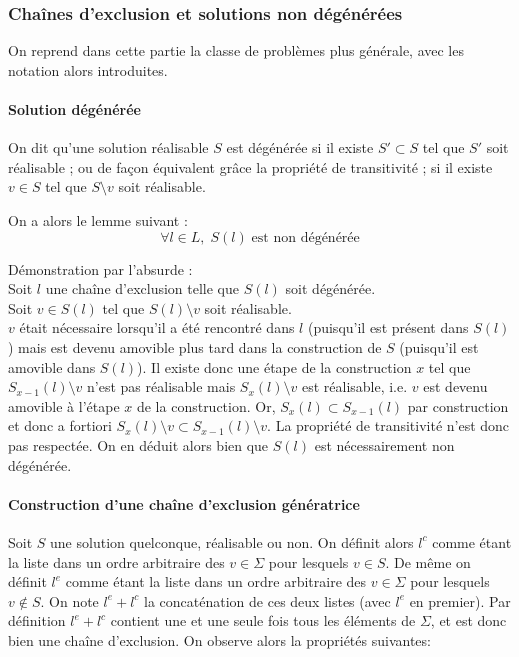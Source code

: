 \documentclass[12pt,a4paper]{article}
\begin{document}
\subsubsection{Chaînes d'exclusion et solutions non dégénérées}

On reprend dans cette partie la classe de problèmes plus générale, avec les notation alors introduites.

 \paragraph{Solution dégénérée}
 
On dit qu'une solution réalisable $S$ est dégénérée si il existe $S'\subset S$ tel que $S'$ soit réalisable ; ou de façon équivalent grâce la propriété de transitivité ; si il existe $v\in S$ tel que $S\setminus v$ soit réalisable.

On a alors le lemme suivant :
\[\forall l\in L,\; S(l)\;\text{est non dégénérée}\]

Démonstration par l'absurde : 
\\Soit $l$ une chaîne d'exclusion telle que $S(l)$ soit dégénérée. 
\\Soit $v\in S(l)$ tel que $S(l)\setminus v$ soit réalisable.
\\$v$ était nécessaire lorsqu'il a été rencontré dans $l$ (puisqu'il est présent dans $S(l)$) mais est devenu amovible plus tard dans la construction de $S$ (puisqu'il est amovible dans $S(l)$). Il existe donc une étape de la construction $x$ tel que $S_{x-1}(l)\setminus v$ n'est pas réalisable mais $S_x(l)\setminus v$ est réalisable, i.e. $v$ est devenu amovible à l'étape $x$ de la construction. Or, $S_x(l)\subset S_{x-1}(l)$ par construction et donc a fortiori $S_x(l)\setminus v \subset S_{x-1}(l)\setminus v$. La propriété de transitivité n'est donc pas respectée.
On en déduit alors bien que $S(l)$ est nécessairement non dégénérée.

\paragraph{Construction d'une chaîne d'exclusion génératrice}
Soit $S$ une solution quelconque, réalisable ou non. On définit alors $l^c$ comme étant la liste dans un ordre arbitraire des  $v\in \Sigma$ pour lesquels $v\in S$. De même on définit $l^e$ comme étant la liste dans un ordre arbitraire des $v\in \Sigma$ pour lesquels $v\notin S$. On note $l^e+l^c$ la concaténation de ces deux listes (avec $l^e$ en premier). Par définition $l^e+l^c$ contient une et une seule fois tous les éléments de $\Sigma$, et est donc bien une chaîne d'exclusion. On observe alors la propriétés suivantes:
\end{document}
